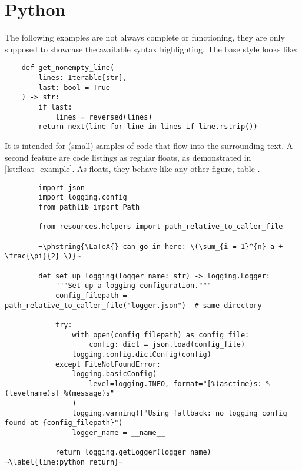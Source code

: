 \section{Python}
The following examples are not always complete or functioning, they are only supposed
to showcase the available syntax highlighting.
The base style looks like:
\begin{verbatim}
    def get_nonempty_line(
        lines: Iterable[str],
        last: bool = True
    ) -> str:
        if last:
            lines = reversed(lines)
        return next(line for line in lines if line.rstrip())
\end{verbatim}
It is intended for (small) samples of code that flow into the surrounding text.
A second feature are code listings as regular floats, as demonstrated in
\cref{lst:float_example}.
As floats, they behave like any other figure, table .

\begin{listing}
    \caption{%
        This is a caption.
        Listings cannot be overly long since floats do not page-break. Therefore is the longlisting environment.%
    }
    \label{lst:float_example}
    \begin{verbatim}
        import json
        import logging.config
        from pathlib import Path

        from resources.helpers import path_relative_to_caller_file

        ¬\phstring{\LaTeX{} can go in here: \(\sum_{i = 1}^{n} a + \frac{\pi}{2} \)}¬

        def set_up_logging(logger_name: str) -> logging.Logger:
            """Set up a logging configuration."""
            config_filepath = path_relative_to_caller_file("logger.json")  # same directory

            try:
                with open(config_filepath) as config_file:
                    config: dict = json.load(config_file)
                logging.config.dictConfig(config)
            except FileNotFoundError:
                logging.basicConfig(
                    level=logging.INFO, format="[%(asctime)s: %(levelname)s] %(message)s"
                )
                logging.warning(f"Using fallback: no logging config found at {config_filepath}")
                logger_name = __name__

            return logging.getLogger(logger_name) ¬\label{line:python_return}¬
    \end{verbatim}
\end{listing}

